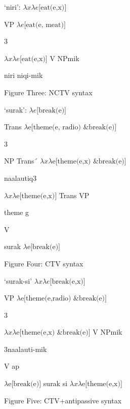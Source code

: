 \documentclass[output=paper,modfonts,nonflat]{langsci/langscibook}
\begin{document}
           ‘niri’:   $\mathit{\lambda x\lambda e}\text{[eat(e,x)]}$

VP     $\mathit{\lambda e}\text{[eat(e, meat)]}$

           3  

 $\mathit{\lambda x\lambda e}\text{[eat(e,x)]}$               V            NPmik

    niri          niqi-mik

\begin{stylecaption}
Figure Three: NCTV syntax
\end{stylecaption}

  ‘surak’:   $\mathit{\lambda e}\text{[break(e)]}$

Trans     $\lambda \text{e[}\text{theme(e, radio) \& break(e)]}$

      3  

         NP        Trans´   $\mathit{\lambda x\lambda} \text{e[}\text{theme(e,x) \& break(e)]}$

    naalautiq3

 $\mathit{\lambda x\lambda} \text{e[theme(e,x)]}$        Trans      VP

         theme  g

                 V

                surak     $\lambda \text{e[break(e)]}$

\begin{stylecaption}
Figure Four: CTV syntax
\end{stylecaption}

        ‘surak-si’   $\mathit{\lambda x\lambda e}\text{[break(e,x)]}$

VP     $\lambda \text{e[theme(e,radio) \& break(e)]}$

        3

 $\mathit{\lambda x\lambda} \text{e[theme(e,x) \& break(e)]}$  V    NPmik

3naalauti-mik

V       ap

 $\lambda \text{e[break(e)]}$           surak         si     $\mathit{\lambda x\lambda} \text{e[theme(e,x)]}$

\begin{stylecaption}
Figure Five: CTV+antipassive syntax
\end{stylecaption}
\end{document}
